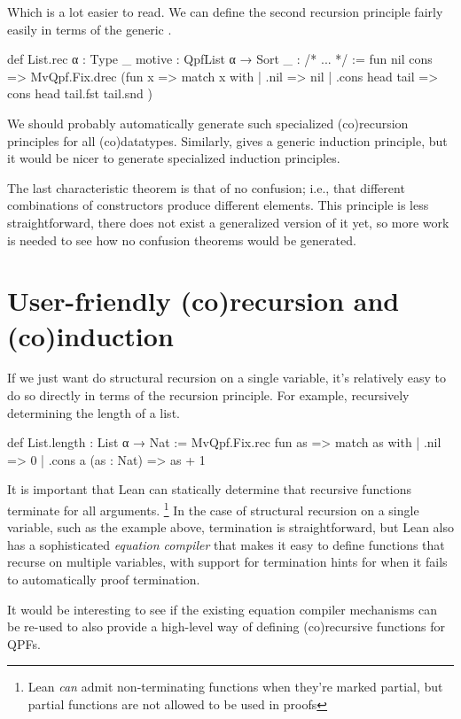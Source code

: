 Which is a lot easier to read.
We can define the second recursion principle fairly easily in terms of the generic .
\begin{leancode}
  def List.rec {α : Type _} {motive : QpfList α → Sort _} : /* ... */ :=
    fun nil cons => MvQpf.Fix.drec (fun x => 
      match x with
      | .nil            => nil
      | .cons head tail => cons head tail.fst tail.snd
    )
\end{leancode}

We should probably automatically generate such specialized (co)recursion principles for all (co)datatypes.
Similarly,  gives a generic induction principle, but it would be nicer to generate
specialized induction principles.


The last characteristic theorem is that of no confusion; i.e., that different combinations of constructors
produce different elements. This principle is less straightforward, there does not exist a generalized
version of it yet, so more work is needed to see how no confusion theorems would be generated.



\section{User-friendly (co)recursion and (co)induction}
If we just want do structural recursion on a single variable, it's relatively easy to do so directly
in terms of the recursion principle.
For example, recursively determining the length of a list.
\begin{leancode}
def List.length : List α → Nat :=
  MvQpf.Fix.rec fun as => match as with
    | .nil                => 0
    | .cons a (as : Nat)  => as + 1 
\end{leancode}

It is important that Lean can statically determine that recursive functions terminate for all 
arguments. \footnote{Lean \emph{can} admit non-terminating functions when they're marked partial, but partial functions are not allowed to be used in proofs}
In the case of structural recursion on a single variable, such as the example above, termination is straightforward,
but Lean also has a sophisticated \emph{equation compiler} that makes it easy to define functions that recurse
on multiple variables, with support for termination hints for when it fails to automatically proof
termination.

It would be interesting to see if the existing equation compiler mechanisms can be re-used
to also provide a high-level way of defining (co)recursive functions for QPFs.

